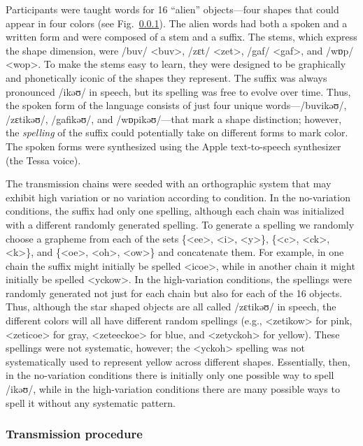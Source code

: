 \documentclass[doc,biblatex]{apa7}
\begin{document}
Participants were taught words for 16 ``alien'' objects---four shapes that could appear in four colors (see Fig.~\ref{}). The alien words had both a spoken and a written form and were composed of a stem and a suffix. The stems, which express the shape dimension, were /buv/ <buv>, /zɛt/ <zet>, /gaf/ <gaf>, and /wɒp/ <wop>. To make the stems easy to learn, they were designed to be graphically and phonetically iconic of the shapes they represent. The suffix was always pronounced /ikəʊ/ in speech, but its spelling was free to evolve over time. Thus, the spoken form of the language consists of just four unique words---/buvikəʊ/, /zɛtikəʊ/, /gafikəʊ/, and /wɒpikəʊ/---that mark a shape distinction; however, the \textit{spelling} of the suffix could potentially take on different forms to mark color. The spoken forms were synthesized using the Apple text-to-speech synthesizer (the Tessa voice).

The transmission chains were seeded with an orthographic system that may exhibit high variation or no variation according to condition. In the no-variation conditions, the suffix had only one spelling, although each chain was initialized with a different randomly generated spelling. To generate a spelling we randomly choose a grapheme from each of the sets \{<ee>, <i>, <y>\}, \{<c>, <ck>, <k>\}, and \{<oe>, <oh>, <ow>\} and concatenate them. For example, in one chain the suffix might initially be spelled <icoe>, while in another chain it might initially be spelled <yckow>. In the high-variation conditions, the spellings were randomly generated not just for each chain but also for each of the 16 objects. Thus, although the star shaped objects are all called /zɛtikəʊ/ in speech, the different colors will all have different random spellings (e.g., <zetikow> for pink, <zeticoe> for gray, <zeteeckoe> for blue, and <zetyckoh> for yellow). These spellings were not systematic, however; the <yckoh> spelling was not systematically used to represent yellow across different shapes. Essentially, then, in the no-variation conditions there is initially only one possible way to spell /ikəʊ/, while in the high-variation conditions there are many possible ways to spell it without any systematic pattern.

\subsubsection{Transmission procedure}
\end{document}
